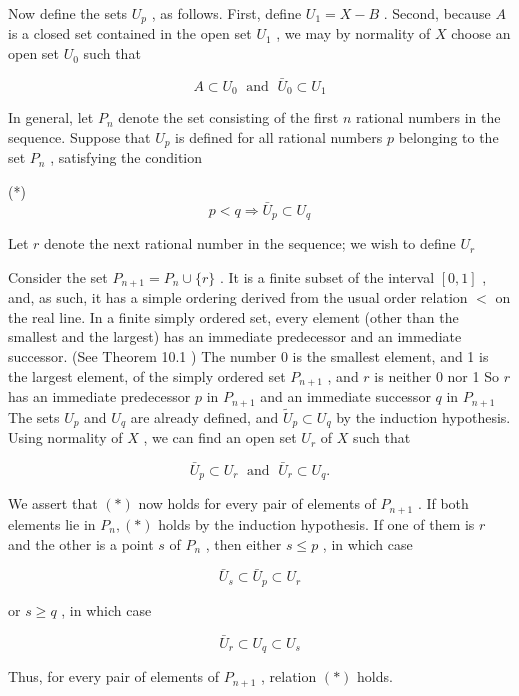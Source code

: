 \documentclass[10pt]{article}
\begin{document}
Now define the sets \({U}_{p}\) , as follows. First, define \({U}_{1} = X - B\) . Second, because \(A\) is a closed set contained in the open set \({U}_{1}\) , we may by normality of \(X\) choose an open set \({U}_{0}\) such that

\[
A \subset  {U}_{0}\;\text{ and }\;{\bar{U}}_{0} \subset  {U}_{1}
\]

In general, let \({P}_{n}\) denote the set consisting of the first \(n\) rational numbers in the sequence. Suppose that \({U}_{p}\) is defined for all rational numbers \(p\) belonging to the set \({P}_{n}\) , satisfying the condition

(*)
\[
p < q \Rightarrow  {\bar{U}}_{p} \subset  {U}_{q}
\]

Let \(r\) denote the next rational number in the sequence; we wish to define \({U}_{r}\)

Consider the set \({P}_{n + 1} = {P}_{n} \cup  \{ r\}\) . It is a finite subset of the interval \(\left\lbrack  {0,1}\right\rbrack\) , and, as such, it has a simple ordering derived from the usual order relation \(<\) on the real line. In a finite simply ordered set, every element (other than the smallest and the largest) has an immediate predecessor and an immediate successor. (See Theorem 10.1 ) The number 0 is the smallest element, and 1 is the largest element, of the simply ordered set \({P}_{n + 1}\) , and \(r\) is neither 0 nor 1 So \(r\) has an immediate predecessor \(p\) in \({P}_{n + 1}\) and an immediate successor \(q\) in \({P}_{n + 1}\) The sets \({U}_{p}\) and \({U}_{q}\) are already defined, and \({\widetilde{U}}_{p} \subset  {U}_{q}\) by the induction hypothesis. Using normality of \(X\) , we can find an open set \({U}_{r}\) of \(X\) such that

\[
{\bar{U}}_{p} \subset  {U}_{r}\;\text{ and }\;{\bar{U}}_{r} \subset  {U}_{q}.
\]

We assert that \(\left( *\right)\) now holds for every pair of elements of \({P}_{n + 1}\) . If both elements lie in \({P}_{n},\left( *\right)\) holds by the induction hypothesis. If one of them is \(r\) and the other is a point \(s\) of \({P}_{n}\) , then either \(s \leq  p\) , in which case

\[
{\bar{U}}_{s} \subset  {\bar{U}}_{p} \subset  {U}_{r}
\]

or \(s \geq  q\) , in which case

\[
{\bar{U}}_{r} \subset  {U}_{q} \subset  {U}_{s}
\]

Thus, for every pair of elements of \({P}_{n + 1}\) , relation \(\left( *\right)\) holds.
\end{document}
